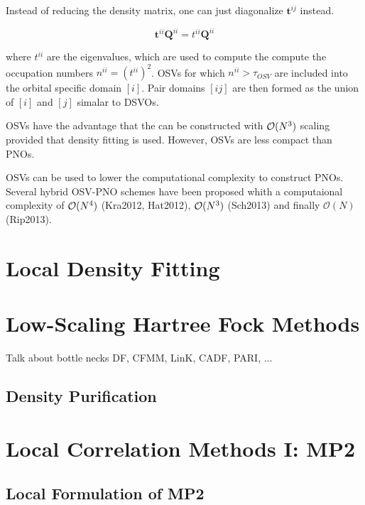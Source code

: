 Instead of reducing the density matrix, one can just diagonalize $\mathbf{t}^{ij}$ instead. 

\begin{equation}
\mathbf{t}^{ii} \mathbf{Q}^{ii} = t^{ii} \mathbf{Q}^{ii}
\end{equation}

\noindent where $t^{ii}$ are the eigenvalues, which are used to compute the compute the occupation numbers $n^{ii} = \left( t^{ii} \right)^2$. OSVs for which $n^{ii} > \tau_{OSV}$ are included into the orbital specific domain $[i]$. Pair domains $[ij]$ are then formed as the union of $[i]$ and $[j]$ simalar to DSVOs. 

OSVs have the advantage that the can be constructed with $\mathcal{O}(N^{3})$ scaling provided that density fitting is used. However, OSVs are less compact than PNOs.

OSVs can be used to lower the computational complexity to construct PNOs. Several hybrid OSV-PNO schemes have been proposed whith a computaional complexity of $\mathcal{O}(N^{4})$ (Kra2012, Hat2012), $\mathcal{O}(N^{3})$ (Sch2013) and finally $\mathcal{O}(N)$ (Rip2013).


\section{Local Density Fitting}


\section{Low-Scaling Hartree Fock Methods}

Talk about bottle necks
DF, CFMM, LinK, CADF, PARI, ...

\subsection{Density Purification}

\section{Local Correlation Methods I: MP2}

\subsection{Local Formulation of MP2}

